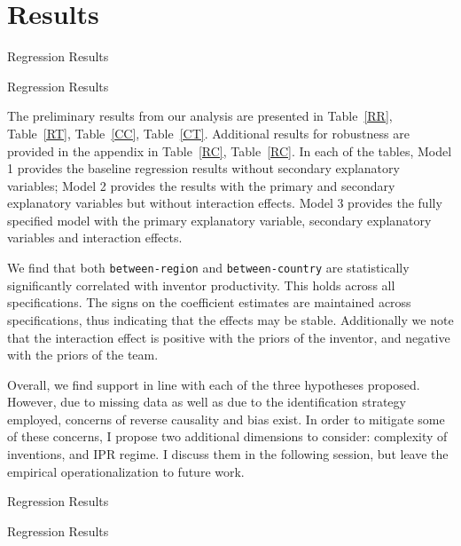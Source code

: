 \documentclass[12pt]{article}
\begin{document}
\section{Results}
\begin{table}
\caption{Regression Results}

\label{RR}
\end{table}

\begin{table}
\caption{Regression Results}

\label{RT}
\end{table}
The preliminary results from our analysis are presented in Table~\ref{RR},  Table~\ref{RT}, Table~\ref{CC},  Table~\ref{CT}. Additional results for robustness are provided in the appendix in Table~\ref{RC},  Table~\ref{RC}. In each of the tables, Model 1 provides the baseline regression results without secondary explanatory variables; Model 2 provides the results with the primary and secondary explanatory variables but without interaction effects. Model 3 provides the fully specified model with the primary explanatory variable, secondary explanatory variables and interaction effects. \par

We find that both \texttt{between-region} and \texttt{between-country} are statistically significantly correlated with inventor productivity. This holds across all specifications. The  signs on the coefficient estimates are maintained across specifications, thus indicating that the effects may be stable. Additionally we note that the interaction effect is positive with the priors of the inventor, and negative with the priors of the team.

Overall, we find support in line with each of the three hypotheses proposed. However, due to missing data as well as due to the identification strategy employed, concerns of reverse causality and bias exist. In order to mitigate some of these concerns, I propose two additional dimensions to consider: complexity of inventions, and IPR regime. I discuss them in the following session, but leave the empirical operationalization to future work.

\begin{table}
\caption{Regression Results}

\label{CC}
\end{table}

\begin{table}
\caption{Regression Results}

\label{CT}
\end{table}
\end{document}
